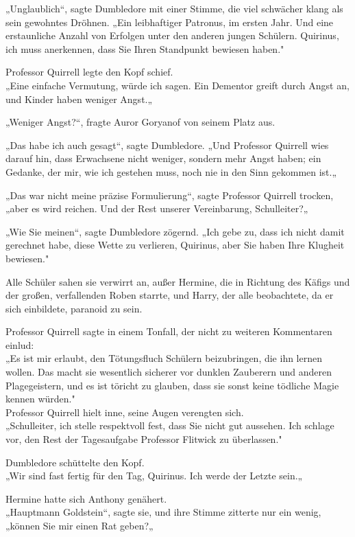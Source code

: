 {„Unglaublich“, sagte Dumbledore mit einer Stimme, die viel schwächer klang als sein gewohntes Dröhnen. „Ein leibhaftiger Patronus, im ersten Jahr. Und eine erstaunliche Anzahl von Erfolgen unter den anderen jungen Schülern. Quirinus, ich muss anerkennen, dass Sie Ihren Standpunkt bewiesen haben."

Professor Quirrell legte den Kopf schief.\\ „Eine einfache Vermutung, würde ich sagen. Ein Dementor greift durch Angst an, und Kinder haben weniger Angst.„

„Weniger Angst?“, fragte Auror Goryanof von seinem Platz aus.

„Das habe ich auch gesagt“, sagte Dumbledore. „Und Professor Quirrell wies darauf hin, dass Erwachsene nicht weniger, sondern mehr Angst haben; ein Gedanke, der mir, wie ich gestehen muss, noch nie in den Sinn gekommen ist.„

„Das war nicht meine präzise Formulierung“, sagte Professor Quirrell trocken, „aber es wird reichen. Und der Rest unserer Vereinbarung, Schulleiter?„

„Wie Sie meinen“, sagte Dumbledore zögernd. „Ich gebe zu, dass ich nicht damit gerechnet habe, diese Wette zu verlieren, Quirinus, aber Sie haben Ihre Klugheit bewiesen."

Alle Schüler sahen sie verwirrt an, außer Hermine, die in Richtung des Käfigs und der großen, verfallenden Roben starrte, und Harry, der alle beobachtete, da er sich einbildete, paranoid zu sein.

Professor Quirrell sagte in einem Tonfall, der nicht zu weiteren Kommentaren einlud:\\ „Es ist mir erlaubt, den Tötungsfluch Schülern beizubringen, die ihn lernen wollen. Das macht sie wesentlich sicherer vor dunklen Zauberern und anderen Plagegeistern, und es ist töricht zu glauben, dass sie sonst keine tödliche Magie kennen würden."\\ Professor Quirrell hielt inne, seine Augen verengten sich.\\ „Schulleiter, ich stelle respektvoll fest, dass Sie nicht gut aussehen. Ich schlage vor, den Rest der Tagesaufgabe Professor Flitwick zu überlassen."

Dumbledore schüttelte den Kopf.\\ „Wir sind fast fertig für den Tag, Quirinus. Ich werde der Letzte sein.„

Hermine hatte sich Anthony genähert.\\ „Hauptmann Goldstein“, sagte sie, und ihre Stimme zitterte nur ein wenig, „können Sie mir einen Rat geben?„

}
